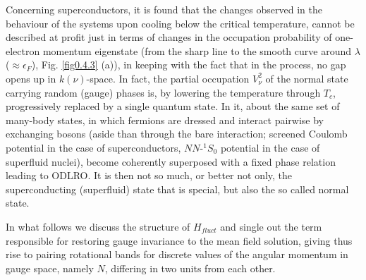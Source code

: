  Concerning superconductors, it is found that the changes observed in the behaviour of the systems upon cooling below the critical temperature, cannot be described at profit just in terms of changes in the occupation probability of one-electron momentum eigenstate (from the sharp line to the smooth curve around $\lambda$ ($\approx\epsilon_F$), Fig. \ref{fig0.4.3} (a)), in keeping with the fact that in the process, no gap opens up in $k(\nu)$-space. In fact, the partial occupation $V^2_\nu$ of the normal state carrying random (gauge) phases is, by lowering the temperature through $T_c$, progressively replaced by a single quantum state. In it, about the same set of many-body states, in which fermions are dressed and interact pairwise by exchanging  bosons (aside than through the bare interaction; screened Coulomb potential in the case of superconductors, $NN$-$^1S_0$ potential in the case of superfluid nuclei), become coherently superposed with a fixed phase relation leading to ODLRO. It is then not so much, or better not only, the superconducting (superfluid) state that is special, but also the so called normal state.
 
In what follows we  discuss the structure of $H_{fluct}$ and single out the term responsible for restoring gauge invariance to the  mean field solution, giving thus rise to pairing rotational bands for discrete values of the angular momentum in gauge space, namely $N$, differing in two units from each other. 



